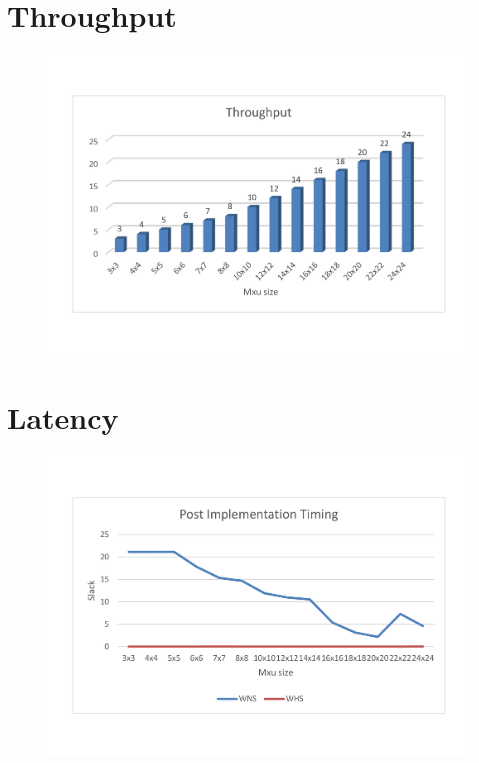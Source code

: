 \newpage
\section{Throughput}
\begin{figure}[!htbp]
\centering
\captionsetup{justification=centering}
\includegraphics[scale=0.5,angle=0]{./figure/graphs/throughput.pdf}
\label{fig:tp8bit}
\end{figure}


\newpage
\section{Latency}

\begin{figure}[!htbp]
\centering
\captionsetup{justification=centering}
\includegraphics[scale=0.5,angle=0]{./figure/graphs/graph_timing.pdf}
\label{fig:tim8bit}
\end{figure}


